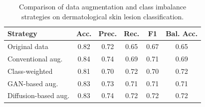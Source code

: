 \begin{table}[h]
\centering
\caption{Comparison of data augmentation and class imbalance strategies on dermatological skin lesion classification.}
\label{tab:strategy_comparison}
\begin{tabular}{lccccc}
\hline
\textbf{Strategy} & \textbf{Acc.} & \textbf{Prec.} & \textbf{Rec.} & \textbf{F1} & \textbf{Bal. Acc.} \\
\hline
Original data        & 0.82 & 0.72 & 0.65 & 0.67 & 0.65 \\
Conventional aug.    & 0.84 & 0.74 & 0.69 & 0.71 & 0.69 \\
Class-weighted       & 0.81 & 0.70 & 0.72 & 0.70 & 0.72 \\
GAN-based aug.       & 0.83 & 0.73 & 0.71 & 0.71 & 0.71 \\
Diffusion-based aug. & 0.83 & 0.74 & 0.72 & 0.72 & 0.72 \\
\hline
\end{tabular}
\end{table}

